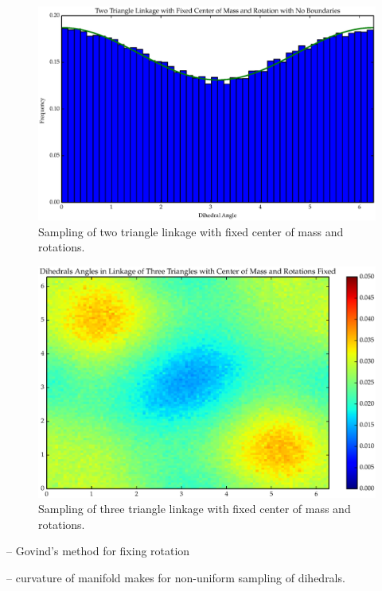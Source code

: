 \begin{figure}[ht]
\centering
  \includegraphics[scale=0.6]{images/T2_5.eps}
\caption{Sampling of two triangle linkage with fixed center of mass and rotations.}
\label{fig:T2_5}
\end{figure}

\begin{figure}[ht]
\centering
  \includegraphics[scale=0.6]{images/T3_6_2D.eps}
\caption{Sampling of three triangle linkage with fixed center of mass and rotations.}
\label{fig:T3_6}
\end{figure}

-- Govind's method for fixing rotation



-- curvature of manifold makes for non-uniform sampling of dihedrals.

